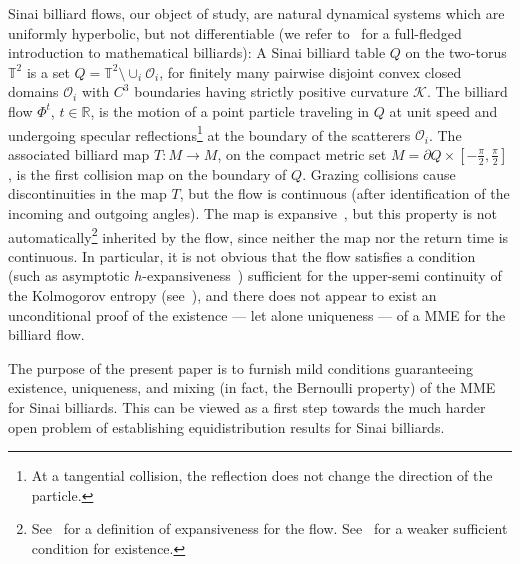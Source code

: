 \documentclass[10pt]{amsart}
\theoremstyle{definition}\newtheorem{defi}[theo]{Definition}\newtheorem{rema}[theo]{Remark}\newtheorem{exam}[theo]{Example}\newtheorem{exem}[theo]{Example}\newtheorem{nota}[theo]{Notation}
\newcommand{\cK}{\mathcal{K}}
\newcommand{\OO}{\mathcal{O}}
\newcommand{\bbT}{\mathbb{T}}
\newcommand{\bbR}{\mathbb{R}}
\begin{document}
Sinai billiard flows, our object of study, are natural dynamical systems which are uniformly hyperbolic, but not differentiable (we refer to~\cite{CM} for a full-fledged introduction to mathematical billiards): A Sinai billiard table $Q$ on the two-torus $\bbT^2$ is a set $ Q=\bbT^2 \setminus \cup_{i} \OO_i $, for finitely many pairwise disjoint convex closed domains $\OO_i$ with $C^3$ boundaries having strictly positive curvature $\cK$. The billiard flow $\Phi^t$, $t \in \bbR$, is the motion of a point particle traveling in $Q$ at unit speed and undergoing specular reflections\footnote{At a tangential collision, the reflection does not change the direction of the particle.} at the boundary of the scatterers $\OO_i$. The associated billiard map $T:M\to M$, on the compact metric set $M = \partial Q \times [-\frac{\pi}{2}, \frac{\pi}{2}]$, is the first collision map on the boundary of $Q$. Grazing collisions cause discontinuities in the map $T$, but the flow is continuous (after identification of the incoming and outgoing angles). The map is expansive~\cite{BD1}, but this property is not automatically\footnote{See~\cite{BW} for a definition of expansiveness for the flow. See~\cite[Ex.~1.6]{Bo0} for a weaker sufficient condition for existence.} inherited by the flow, since neither the map nor the return time is continuous. In particular, it is not obvious that the flow satisfies a condition (such as asymptotic $h$-expansiveness~\cite{Mi}) sufficient for the upper-semi continuity of the Kolmogorov entropy (see~\cite[App. A--B]{Ca}), and there does not appear to exist an unconditional proof of the existence --- let alone uniqueness --- of a MME for the billiard flow.



The purpose of the present paper is to furnish mild conditions guaranteeing existence, uniqueness, and mixing (in fact, the Bernoulli property) of the MME for Sinai billiards. This can be viewed as a first step towards the much harder open problem of establishing equidistribution results for Sinai billiards.
\end{document}
